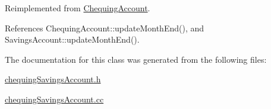 Reimplemented from \hyperlink{classChequingAccount_03a0e06869ce9180c4e7ef2fdb39e616}{ChequingAccount}.

References ChequingAccount::updateMonthEnd(), and SavingsAccount::updateMonthEnd().

The documentation for this class was generated from the following files:\begin{CompactItemize}
\item 
\hyperlink{chequingSavingsAccount_8h}{chequingSavingsAccount.h}\item 
\hyperlink{chequingSavingsAccount_8cc}{chequingSavingsAccount.cc}\end{CompactItemize}
